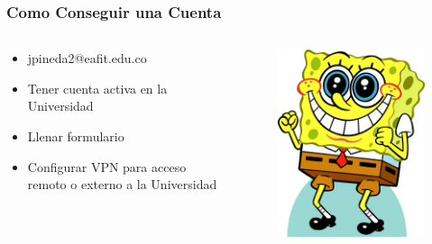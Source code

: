 \begin{frame}
\frametitle{Como Conseguir una Cuenta}
  \begin{columns}
    \begin{column}[ht]{5cm}
      \begin{itemize}
      \item jpineda2@eafit.edu.co
      \item Tener cuenta activa en la Universidad
      \item Llenar formulario
      \item Configurar VPN para acceso remoto o externo a la Universidad
      \end{itemize}
    \end{column}
    \begin{column}[ht]{5cm}
      \begin{figure}[ht]
        \centering
        \includegraphics[scale=0.35]{imgs/bobe}
      \end{figure}
    \end{column}
  \end{columns}
\end{frame}

